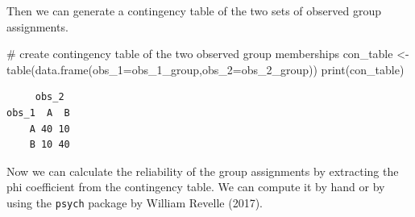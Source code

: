\documentclass[
  letterpaper,
  DIV=11,
  numbers=noendperiod]{scrreprt}
\newenvironment{Shaded}{\begin{snugshade}}{\end{snugshade}}
\newcommand{\AttributeTok}[1]{\textcolor[rgb]{0.40,0.45,0.13}{#1}}
\newcommand{\CommentTok}[1]{\textcolor[rgb]{0.37,0.37,0.37}{#1}}
\newcommand{\FunctionTok}[1]{\textcolor[rgb]{0.28,0.35,0.67}{#1}}
\newcommand{\NormalTok}[1]{\textcolor[rgb]{0.00,0.23,0.31}{#1}}
\newcommand{\OtherTok}[1]{\textcolor[rgb]{0.00,0.23,0.31}{#1}}
\begin{document}
Then we can generate a contingency table of the two sets of observed
group assignments.

\begin{Shaded}
\begin{Highlighting}[]
\CommentTok{\# create contingency table of the two observed group memberships}
\NormalTok{con\_table }\OtherTok{\textless{}{-}} \FunctionTok{table}\NormalTok{(}\FunctionTok{data.frame}\NormalTok{(}\AttributeTok{obs\_1=}\NormalTok{obs\_1\_group,}\AttributeTok{obs\_2=}\NormalTok{obs\_2\_group))}
\FunctionTok{print}\NormalTok{(con\_table)}
\end{Highlighting}
\end{Shaded}

\begin{verbatim}
     obs_2
obs_1  A  B
    A 40 10
    B 10 40
\end{verbatim}

Now we can calculate the reliability of the group assignments by
extracting the phi coefficient from the contingency table. We can
compute it by hand or by using the \texttt{psych} package by William
Revelle (2017).
\end{document}
